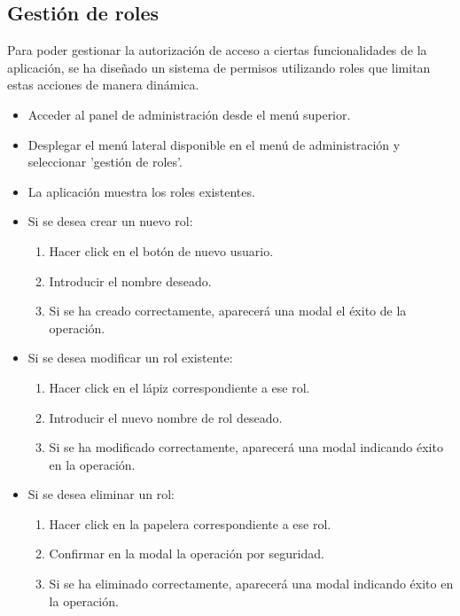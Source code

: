 \subsection{Gestión de roles}
Para poder gestionar la autorización de acceso a ciertas funcionalidades de la aplicación, se ha diseñado un sistema de permisos utilizando roles que limitan estas acciones de manera dinámica.

\begin{itemize}
    \item Acceder al panel de administración desde el menú superior.
    \item Desplegar el menú lateral disponible en el menú de administración y seleccionar 'gestión de roles'.
    \item La aplicación muestra los roles existentes.
    \item Si se desea crear un nuevo rol:
    \begin{enumerate}
        \item Hacer click en el botón de nuevo usuario.
        \item Introducir el nombre deseado.
        \item Si se ha creado correctamente, aparecerá una modal el éxito de la operación.
    \end{enumerate}
    \item Si se desea modificar un rol existente:
    \begin{enumerate}
        \item Hacer click en el lápiz correspondiente a ese rol.
        \item Introducir el nuevo nombre de rol deseado.
        \item Si se ha modificado correctamente, aparecerá una modal indicando éxito en la operación.
    \end{enumerate}
    \item Si se desea eliminar un rol:
    \begin{enumerate}
        \item Hacer click en la papelera correspondiente a ese rol.
        \item Confirmar en la modal la operación por seguridad.
        \item Si se ha eliminado correctamente, aparecerá una modal indicando éxito en la operación.
    \end{enumerate}


\end{itemize}
